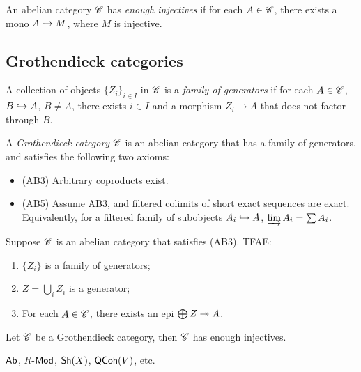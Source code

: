 \documentclass[11pt]{amsart}
\begin{document}
\begin{defn}
    An abelian category $\mathscr{C}$ has \emph{enough injectives} if for each $A\in \mathscr{C}$, there exists a mono $A\hookrightarrow M$, where $M$ is injective.
\end{defn}


\subsection{Grothendieck categories}


\begin{defn}
    A collection of objects $\{Z_i\}_{i\in I}$ in $\mathscr{C}$ is a \emph{family of generators} if for each $A\in \mathscr{C}$, $B\hookrightarrow A$, $B\neq A$, there exists $i\in I$ and a morphism $Z_i\to A$ that does not factor through $B$.
\end{defn}

\begin{defn}
    A \emph{Grothendieck category} $\mathscr{C}$ is an abelian category that has a family of generators, and satisfies the following two axioms:
    \begin{itemize}
        \item (AB3) Arbitrary coproducts exist.
        \item (AB5) Assume AB3, and filtered colimits of short exact sequences are exact. Equivalently, for a filtered family of subobjects $A_i\hookrightarrow A$, $\varinjlim A_i = \sum A_i$.
    \end{itemize}
\end{defn}


\begin{prop}
    Suppose $\mathscr{C}$ is an abelian category that satisfies (AB3). TFAE:
    \begin{enumerate}
        \item $\{Z_i\}$ is a family of generators;
        \item $Z = \bigcup_i Z_i$ is a generator;
        \item For each $A\in \mathscr{C}$, there exists an epi $\bigoplus Z \twoheadrightarrow A$.
    \end{enumerate}
\end{prop}


\begin{thm}[Grothendieck]
    Let $\mathscr{C}$ be a Grothendieck category, then $\mathscr{C}$ has enough injectives.
\end{thm}

\begin{exm}
    $\mathsf{Ab}$, $R$-$\mathsf{Mod}$, $\mathsf{Sh}(X)$, $\mathsf{QCoh}(V)$, etc.
\end{exm}
\end{document}
